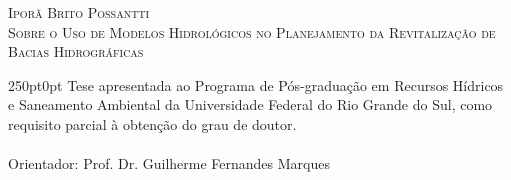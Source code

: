 \documentclass[./main.tex]{subfiles}
\begin{document}
\doublespacing %
\large
\newpage
\thispagestyle{empty}
\begin{center}
	\textsc{Iporã Brito Possantti}\\
	\vspace{30mm}
	\textsc{Sobre o Uso de Modelos Hidrológicos no Planejamento da Revitalização de Bacias Hidrográficas}\\
	\vspace{30mm}
\end{center}
\begin{adjustwidth}{250pt}{0pt}
	\singlespacing
	Tese apresentada ao Programa de Pós-graduação em Recursos Hídricos e Saneamento Ambiental da Universidade Federal do Rio Grande do Sul, como requisito parcial à obtenção do grau de doutor. \\ \\ Orientador: Prof. Dr. Guilherme Fernandes Marques 
\end{adjustwidth}
\clearpage
\end{document}
